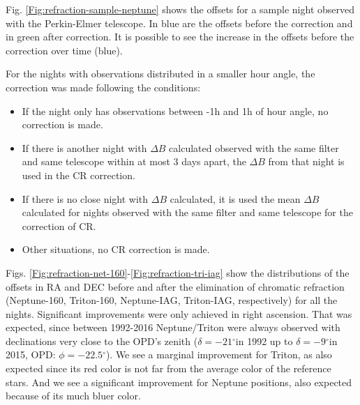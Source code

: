 \documentclass[12pt,a4paper]{report}
\newcommand{\PE}{Perkin-Elmer }
\newcommand{\BC}{Boller \& Chivens }
\newcommand{\degr}{\ensuremath{^{\circ}}}%
\begin{document}
Fig. \ref{Fig:refraction-sample-neptune} shows the offsets for a sample night observed with the Perkin-Elmer telescope. In blue are the offsets before the correction and in green after correction. It is possible to see the increase in the offsets before the correction over time (blue).

For the nights with observations distributed in a smaller hour angle, the correction was made following the conditions:

\begin{itemize}
\item If the night only has observations between -1h and 1h of hour angle, no correction is made.
\item If there is another night with $\Delta B$ calculated observed with the same filter and same telescope within at most 3 days apart, the $\Delta B$ from that night is used in the CR correction.
\item If there is no close night with $\Delta B$ calculated, it is used the mean $\Delta B$ calculated for nights observed with the same filter and same telescope for the correction of CR.
\item Other situations, no CR correction is made.
\end{itemize}

Figs. \ref{Fig:refraction-net-160}-\ref{Fig:refraction-tri-iag} show the distributions of the offsets in RA and DEC before and after the elimination of chromatic refraction (Neptune-160, Triton-160, Neptune-IAG, Triton-IAG, respectively) for all the nights. Significant improvements were only achieved in right ascension. That was expected, since between 1992-2016 Neptune/Triton were always observed with declinations very close to the OPD's zenith ($\delta = -21$\degr in 1992 up to $\delta = -9$\degr in 2015, OPD: $\phi = -22.5$\degr). We see a marginal improvement for Triton, as also expected since its red color is not far from the average color of the reference stars. And we see a significant improvement for Neptune positions, also expected because of its much bluer color. %
\end{document}
